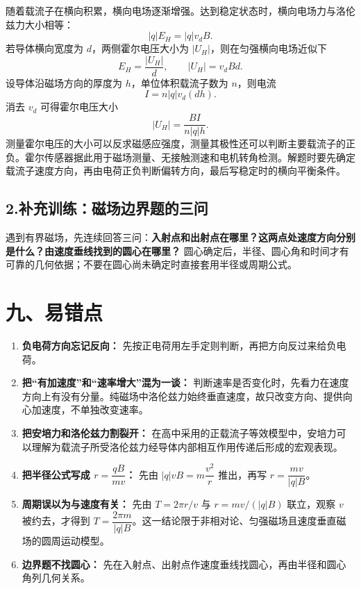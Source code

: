 随着载流子在横向积累，横向电场逐渐增强。达到稳定状态时，横向电场力与洛伦兹力大小相等：
\[
|q|E_H=|q|v_dB.
\]
若导体横向宽度为 $d$，两侧霍尔电压大小为 $|U_H|$，则在匀强横向电场近似下
\[
E_H=\frac{|U_H|}{d},\qquad
\boxed{|U_H|=v_dBd}.
\]
设导体沿磁场方向的厚度为 $h$，单位体积载流子数为 $n$，则电流
\[
I=n|q|v_d(dh).
\]
消去 $v_d$ 可得霍尔电压大小
\[
\boxed{|U_H|=\frac{BI}{n|q|h}}.
\]
测量霍尔电压的大小可以反求磁感应强度，测量其极性还可以判断主要载流子的正负。霍尔传感器据此用于磁场测量、无接触测速和电机转角检测。解题时要先确定载流子速度方向，再由电荷正负判断偏转方向，最后写稳定时的横向平衡条件。

\subsection*{2.\quad 补充训练：磁场边界题的三问}

遇到有界磁场，先连续回答三问：\textbf{入射点和出射点在哪里？这两点处速度方向分别是什么？由速度垂线找到的圆心在哪里？} 圆心确定后，半径、圆心角和时间才有可靠的几何依据；不要在圆心尚未确定时直接套用半径或周期公式。

\section*{九、易错点}

\begin{mistakebox}
\begin{enumerate}
  \item \textbf{负电荷方向忘记反向：} 先按正电荷用左手定则判断，再把方向反过来给负电荷。
  \item \textbf{把“有加速度”和“速率增大”混为一谈：} 判断速率是否变化时，先看力在速度方向上有没有分量。纯磁场中洛伦兹力始终垂直速度，故只改变方向、提供向心加速度，不单独改变速率。
  \item \textbf{把安培力和洛伦兹力割裂开：} 在高中采用的正载流子等效模型中，安培力可以理解为载流子所受洛伦兹力经导体内部相互作用传递后形成的宏观表现。
  \item \textbf{把半径公式写成 $r=\dfrac{qB}{mv}$：} 先由 $|q|vB=m\dfrac{v^2}{r}$ 推出，再写 $r=\dfrac{mv}{|q|B}$。
  \item \textbf{周期误以为与速度有关：} 先由 $T=2\pi r/v$ 与 $r=mv/(|q|B)$ 联立，观察 $v$ 被约去，才得到 $T=\dfrac{2\pi m}{|q|B}$。这一结论限于非相对论、匀强磁场且速度垂直磁场的圆周运动模型。
  \item \textbf{边界题不找圆心：} 先在入射点、出射点作速度垂线找圆心，再由半径和圆心角列几何关系。
\end{enumerate}
\end{mistakebox}

